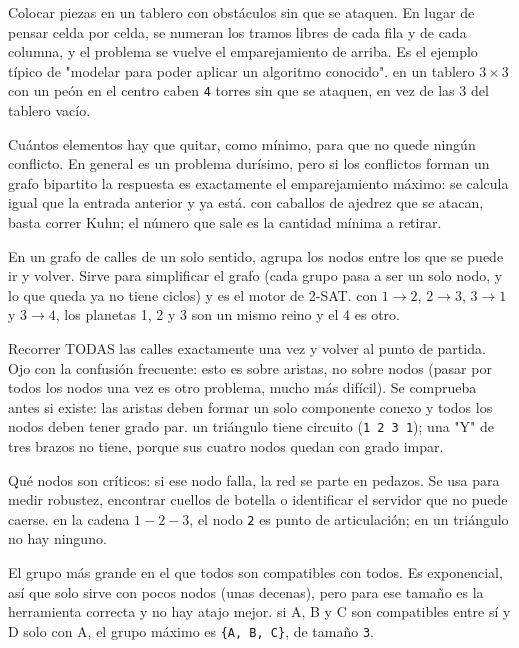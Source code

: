 Colocar piezas en un tablero con obstáculos sin que se ataquen. En lugar de pensar
celda por celda, se numeran los tramos libres de cada fila y de cada columna, y el
problema se vuelve el emparejamiento de arriba. Es el ejemplo típico de "modelar
para poder aplicar un algoritmo conocido".
\ej en un tablero $3\times3$ con un peón en el centro caben \texttt{4} torres sin
que se ataquen, en vez de las 3 del tablero vacío.

Cuántos elementos hay que quitar, como mínimo, para que no quede ningún conflicto.
En general es un problema durísimo, pero si los conflictos forman un grafo
bipartito la respuesta es exactamente el emparejamiento máximo: se calcula igual
que la entrada anterior y ya está.
\ej con caballos de ajedrez que se atacan, basta correr Kuhn; el número que sale
es la cantidad mínima a retirar.

En un grafo de calles de un solo sentido, agrupa los nodos entre los que se puede
ir y volver. Sirve para simplificar el grafo (cada grupo pasa a ser un solo nodo,
y lo que queda ya no tiene ciclos) y es el motor de 2-SAT.
\ej con $1\to2$, $2\to3$, $3\to1$ y $3\to4$, los planetas 1, 2 y 3 son un mismo
reino y el 4 es otro.

Recorrer TODAS las calles exactamente una vez y volver al punto de partida. Ojo con
la confusión frecuente: esto es sobre aristas, no sobre nodos (pasar por todos los
nodos una vez es otro problema, mucho más difícil). Se comprueba antes si existe:
las aristas deben formar un solo componente conexo y todos los nodos deben tener
grado par.
\ej un triángulo tiene circuito (\texttt{1 2 3 1}); una "Y" de tres brazos no
tiene, porque sus cuatro nodos quedan con grado impar.

Qué nodos son críticos: si ese nodo falla, la red se parte en pedazos. Se usa para
medir robustez, encontrar cuellos de botella o identificar el servidor que no puede
caerse.
\ej en la cadena $1-2-3$, el nodo \texttt{2} es punto de articulación; en un
triángulo no hay ninguno.

El grupo más grande en el que todos son compatibles con todos. Es exponencial, así
que solo sirve con pocos nodos (unas decenas), pero para ese tamaño es la
herramienta correcta y no hay atajo mejor.
\ej si A, B y C son compatibles entre sí y D solo con A, el grupo máximo es
\texttt{\{A, B, C\}}, de tamaño \texttt{3}.

